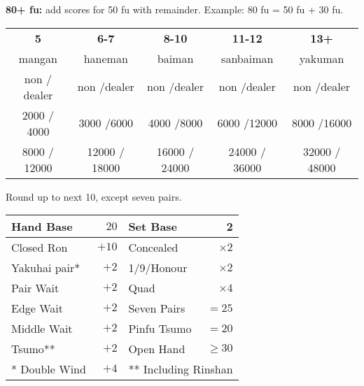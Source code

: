 \documentclass{article}
\newcommand\scorepair[2]{\hfill{}#1 $/$\hfill{}#2}
\begin{document}
\textbf{80+ fu:} add scores for 50 fu with remainder. Example: 80 fu = 50 fu + 30 fu.

\begin{tabular}{|c|c|c|c|c|}
  \hline
  \textbf{\large{}5} & \textbf{\large{}6-7} & \textbf{\large{}8-10} & \textbf{\large{}11-12} & \textbf{\large{}13+}\\
  mangan & haneman & baiman & sanbaiman & yakuman\\
  \hdashline
  \scorepair{non}{dealer} & \scorepair{non}{dealer} & \scorepair{non}{dealer} & \scorepair{non}{dealer} & \scorepair{non}{dealer}\\
  \hline\hline
  \scorepair{2000}{ 4000} & \scorepair{3000}{6000} & \scorepair{4000}{8000} & \scorepair{6000}{12000} & \scorepair{8000}{16000}\\
  \scorepair{8000}{12000} & \scorepair{12000}{18000} & \scorepair{16000}{24000} & \scorepair{24000}{ 36000} & \scorepair{32000}{ 48000}\\
  \hline
\end{tabular}

Round up to next 10, except seven pairs.

\begin{tabular}{|l|r|l|r|}
  \hline
  Hand Base & $20$ & Set Base & 2 \\
  \hline
  Closed Ron & $+10$ & Concealed & $\times 2$\\
  \hline
  Yakuhai pair* & $+2$ & 1/9/Honour & $\times 2$\\
  \hline
  Pair Wait & $+2$ & Quad & $\times 4$\\
  \hline
  Edge Wait & $+2$ & Seven Pairs & $=25$\\
  \hline
  Middle Wait & $+2$ & Pinfu Tsumo & $=20$\\
  \hline
  Tsumo** & $+2$ & Open Hand & $\ge 30$\\
  \hline
  * Double Wind & $+4$ & \multicolumn{2}{l|}{** Including Rinshan}\\
  \hline
\end{tabular}

\pagebreak
\end{document}
